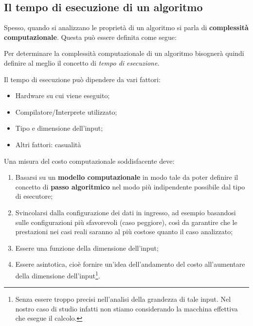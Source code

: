 \subsection{Il tempo di esecuzione di un algoritmo}

Spesso, quando si analizzano le proprietà di un algoritmo si parla di \textbf{complessità computazionale}. Questa può essere definita come segue:


Per determinare la complessità computazionale di un algoritmo bisognerà quindi definire al meglio il concetto di \textit{tempo di esecuzione}.


Il tempo di esecuzione può dipendere da vari fattori:
\begin{itemize}
	\item Hardware su cui viene eseguito;
	\item Compilatore/Interprete utilizzato;
	\item Tipo e dimensione dell'input;
	\item Altri fattori: casualità
\end{itemize}

Una misura del costo computazionale soddisfacente deve:
\begin{enumerate}
    \item Basarsi su un \textbf{modello computazionale} in modo tale da poter definire il concetto di \textbf{passo algoritmico} nel modo più indipendente possibile dal tipo di esecutore;
    \item Svincolarsi dalla configurazione dei dati in ingresso, ad esempio basandosi sulle configurazioni più sfavorevoli (caso peggiore), così da garantire che le prestazioni nei casi reali saranno al più costose quanto il caso analizzato;
    \item Essere una funzione della dimensione dell'input;
    \item Essere asintotica, cioè fornire un'idea dell'andamento del costo all'aumentare della dimensione dell'input\footnote{Senza essere troppo precisi nell'analisi della grandezza di tale input. Nel nostro caso di studio infatti non stiamo considerando la macchina effettiva che esegue il calcolo.}.
\end{enumerate}

